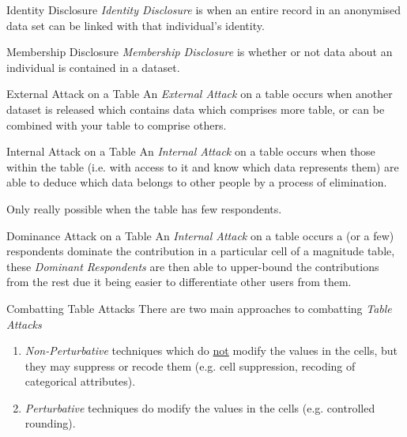\documentclass[11pt,a4paper]{article}
\begin{document}
  \begin{definition}{Identity Disclosure}
    \textit{Identity Disclosure} is when an entire record in an anonymised data set can be linked with that individual's identity.
  \end{definition}

  \begin{definition}{Membership Disclosure}
    \textit{Membership Disclosure} is whether or not data about an individual is contained in a dataset.
  \end{definition}

  \begin{definition}{External Attack on a Table}
    An \textit{External Attack} on a table occurs when another dataset is released which contains data which comprises more table, or can be combined with your table to comprise others.
  \end{definition}

  \begin{definition}{Internal Attack on a Table}
    An \textit{Internal Attack} on a table occurs when those within the table (i.e. with access to it and know which data represents them) are able to deduce which data belongs to other people by a process of elimination.
    \par Only really possible when the table has few respondents.
  \end{definition}

  \begin{definition}{Dominance Attack on a Table}
    An \textit{Internal Attack} on a table occurs a (or a few) respondents dominate the contribution in a particular cell of a magnitude table, these \textit{Dominant Respondents} are then able to upper-bound the contributions from the rest due it being easier to differentiate other users from them.
  \end{definition}

  \begin{proposition}{Combatting Table Attacks}
    There are two main approaches to combatting \textit{Table Attacks}
    \begin{enumerate}
      \item \textit{Non-Perturbative} techniques which do \underline{not} modify the values in the cells, but they may suppress or recode them (e.g. cell suppression, recoding of categorical attributes).
      \item \textit{Perturbative} techniques do modify the values in the cells (e.g. controlled rounding).
    \end{enumerate}
  \end{proposition}
\end{document}
